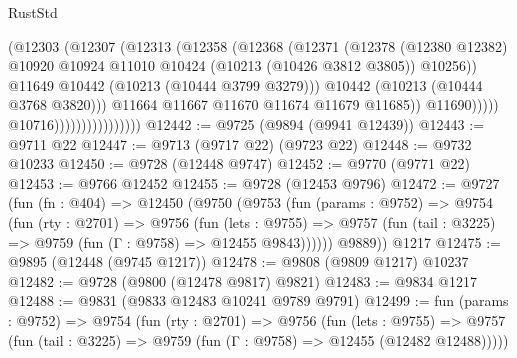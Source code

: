\begin{lexlean}{RustStd}
\begin{coremodule}
{\begin{coremodule}
{{{{{{{{{{{{{{{{{{{{{{{{{{                                            (@12303
                                              (@12307
                                                (@12313
                                                  (@12358
                                                    (@12368
                                                      (@12371
                                                        (@12378
                                                          (@12380 @12382)
                                                          @10920
                                                          @10924
                                                          @11010
                                                          @10424
                                                          (@10213 (@10426 @3812 @3805))
                                                          @10256))
                                                      @11649
                                                      @10442
                                                      (@10213 (@10444 @3799 @3279)))
                                                    @10442
                                                    (@10213 (@10444 @3768 @3820)))
                                                  @11664
                                                  @11667
                                                  @11670
                                                  @11674
                                                  @11679
                                                  @11685))
                                              @11690)))))
                                    @10716))))))))))))))))
@12442 := @9725 (@9894 (@9941 @12439))
@12443 := @9711 @22
@12447 := @9713 (@9717 @22) (@9723 @22)
@12448 := @9732 @10233
@12450 := @9728 (@12448 @9747)
@12452 := @9770 (@9771 @22)
@12453 := @9766 @12452
@12455 := @9728 (@12453 @9796)
@12472 := @9727
    (fun (fn : @404) =>
    @12450
      (@9750
        (@9753
          (fun (params : @9752) =>
          @9754
            (fun (rty : @2701) =>
            @9756
              (fun (lets : @9755) =>
              @9757 (fun (tail : @3225) => @9759 (fun (Γ : @9758) => @12455 @9843))))))
        @9889))
    @1217
@12475 := @9895 (@12448 (@9745 @1217))
@12478 := @9808 (@9809 @1217) @10237
@12482 := @9728 (@9800 (@12478 @9817) @9821)
@12483 := @9834 @1217
@12488 := @9831 (@9833 @12483 @10241 @9789 @9791)
@12499 := fun (params : @9752) =>
  @9754
    (fun (rty : @2701) =>
    @9756
      (fun (lets : @9755) =>
      @9757 (fun (tail : @3225) => @9759 (fun (Γ : @9758) => @12455 (@12482 @12488)))))
}}}}}}}}}}}}}}}}}}}}}}}}}}
\end{coremodule}}
\end{coremodule}
\end{lexlean}
